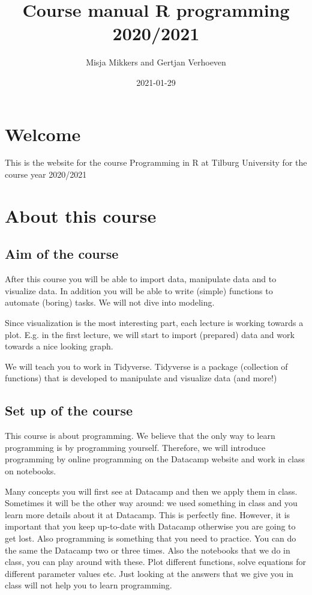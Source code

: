 \documentclass[
]{book}
\title{Course manual R programming 2020/2021}
\author{Misja Mikkers and Gertjan Verhoeven}
\date{2021-01-29}
\begin{document}
\maketitle

{
\setcounter{tocdepth}{1}
\tableofcontents
}
\hypertarget{welcome}{%
\chapter*{Welcome}\label{welcome}}

This is the website for the course Programming in R at Tilburg University for the course year 2020/2021

\hypertarget{about-this-course}{%
\chapter{About this course}\label{about-this-course}}

\hypertarget{aim-of-the-course}{%
\section{Aim of the course}\label{aim-of-the-course}}

After this course you will be able to import data, manipulate data and to visualize data. In addition you will be able to write (simple) functions to automate (boring) tasks. We will not dive into modeling.

Since visualization is the most interesting part, each lecture is working towards a plot. E.g. in the first lecture, we will start to import (prepared) data and work towards a nice looking graph.

We will teach you to work in Tidyverse. Tidyverse is a package (collection of functions) that is developed to manipulate and visualize data (and more!)

\hypertarget{set-up-of-the-course}{%
\section{Set up of the course}\label{set-up-of-the-course}}

This course is about programming. We believe that the only way to learn programming is by programming yourself. Therefore, we will introduce programming by online programming on the Datacamp website and work in class on notebooks.

Many concepts you will first see at Datacamp and then we apply them in class. Sometimes it will be the other way around: we used something in class and you learn more details about it at Datacamp. This is perfectly fine. However, it is important that you keep up-to-date with Datacamp otherwise you are going to get lost. Also programming is something that you need to practice. You can do the same the Datacamp two or three times. Also the notebooks that we do in class, you can play around with these. Plot different functions, solve equations for different parameter values etc. Just looking at the answers that we give you in class will not help you to learn programming.
\end{document}
